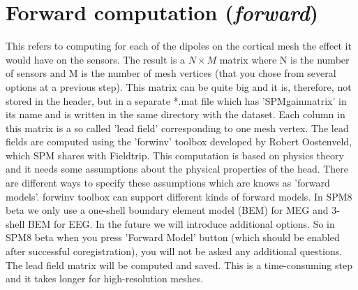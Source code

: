 \section{Forward computation (\textit{forward})}
This refers to computing for each of the dipoles on the cortical mesh the effect it would have on the sensors. The result
is a $N \times M$ matrix where N is the number of sensors and M is the number of mesh vertices (that you chose from several options
at a previous step). This matrix can be quite big and it is, therefore, not stored in the header, but in a separate *.mat file which has
'SPMgainmatrix' in its name and is written in the same directory with the dataset. Each column in this matrix is a so called 'lead field'
corresponding to one mesh vertex. The lead fields are computed using the 'forwinv' toolbox developed by Robert Oostenveld, which 
SPM shares with Fieldtrip. This computation is based on physics theory and it needs some assumptions about the physical properties of the head.
There are different ways to specify these assumptions which are knows as 'forward models'. forwinv toolbox can support different kinds of forward 
models. In SPM8 beta we only use a one-shell boundary element model (BEM) for MEG and 3-shell BEM for EEG. In the future we will introduce additional
options. So in SPM8 beta when you press 'Forward Model' button (which should be enabled after successful coregistration), you will not be asked
any additional questions. The lead field matrix will be computed and saved. This is a time-consuming step and it takes longer for high-resolution
meshes.


